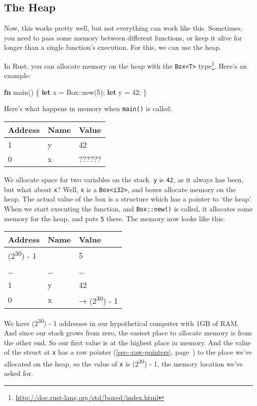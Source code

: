 \documentclass[a4paper,]{book}
\renewcommand*{\hyperref}[2][\ar]{%
  \def\ar{#2}%
  #2 (\autoref{#1}, page~\pageref{#1})}
\newenvironment{Shaded}{\begin{snugshade}}{\end{snugshade}}
\newcommand{\KeywordTok}[1]{\textcolor[rgb]{0.13,0.29,0.53}{\textbf{{#1}}}}
\newcommand{\DecValTok}[1]{\textcolor[rgb]{0.00,0.00,0.81}{{#1}}}
\newcommand{\NormalTok}[1]{{#1}}
\renewcommand{\href}[2]{#2\footnote{\url{#1}}}
\begin{document}
\subsection{The Heap}\label{the-heap}

Now, this works pretty well, but not everything can work like this.
Sometimes, you need to pass some memory between different functions, or
keep it alive for longer than a single function's execution. For this,
we can use the heap.

In Rust, you can allocate memory on the heap with the
\href{http://doc.rust-lang.org/std/boxed/index.html}{\texttt{Box\textless{}T\textgreater{}}
type}. Here's an example:

\begin{Shaded}
\begin{Highlighting}[]
\KeywordTok{fn} \NormalTok{main() \{}
    \KeywordTok{let} \NormalTok{x = Box::new(}\DecValTok{5}\NormalTok{);}
    \KeywordTok{let} \NormalTok{y = }\DecValTok{42}\NormalTok{;}
\NormalTok{\}}
\end{Highlighting}
\end{Shaded}

Here's what happens in memory when \texttt{main()} is called:

\begin{longtable}[c]{@{}lll@{}}
\toprule
Address & Name & Value\tabularnewline
\midrule
\endhead
1 & y & 42\tabularnewline
0 & x & ??????\tabularnewline
\bottomrule
\end{longtable}

We allocate space for two variables on the stack. \texttt{y} is
\texttt{42}, as it always has been, but what about \texttt{x}? Well,
\texttt{x} is a \texttt{Box\textless{}i32\textgreater{}}, and boxes
allocate memory on the heap. The actual value of the box is a structure
which has a pointer to `the heap'. When we start executing the function,
and \texttt{Box::new()} is called, it allocates some memory for the
heap, and puts \texttt{5} there. The memory now looks like this:

\begin{longtable}[c]{@{}lll@{}}
\toprule
Address & Name & Value\tabularnewline
\midrule
\endhead
(2\textsuperscript{30}) - 1 & & 5\tabularnewline
\ldots{} & \ldots{} & \ldots{}\tabularnewline
1 & y & 42\tabularnewline
0 & x & → (2\textsuperscript{30}) - 1\tabularnewline
\bottomrule
\end{longtable}

We have (2\textsuperscript{30}) - 1 addresses in our hypothetical
computer with 1GB of RAM. And since our stack grows from zero, the
easiest place to allocate memory is from the other end. So our first
value is at the highest place in memory. And the value of the struct at
\texttt{x} has a \hyperref[sec--raw-pointers]{raw pointer} to the place
we've allocated on the heap, so the value of \texttt{x} is
(2\textsuperscript{30}) - 1, the memory location we've asked for.
\end{document}
